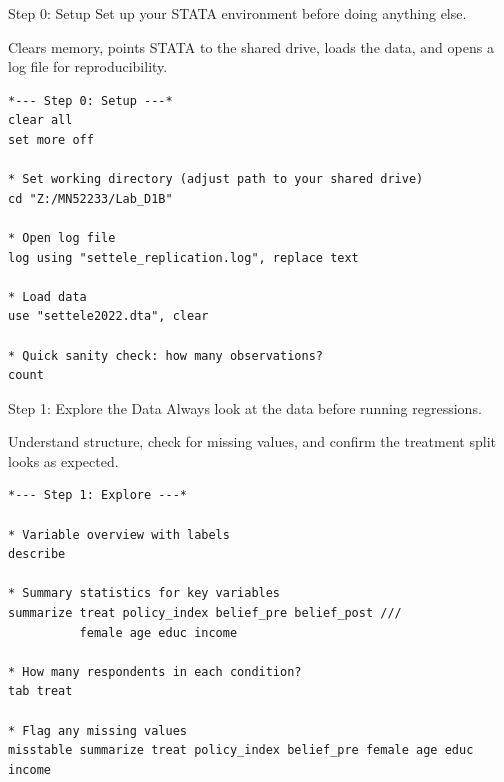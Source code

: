 \documentclass[aspectratio=169, 11pt]{beamer}
\begin{document}

\begin{frame}[fragile, t]{Step 0: Setup}
Set up your STATA environment before doing anything else.
\vspace{0.3em}
\begin{examplebox}
Clears memory, points STATA to the shared drive, loads the data, and opens a log file for reproducibility.
\end{examplebox}
\vspace{0.3em}
\begin{footnotesize}
\begin{verbatim}
*--- Step 0: Setup ---*
clear all
set more off

* Set working directory (adjust path to your shared drive)
cd "Z:/MN52233/Lab_D1B"

* Open log file
log using "settele_replication.log", replace text

* Load data
use "settele2022.dta", clear

* Quick sanity check: how many observations?
count
\end{verbatim}
\end{footnotesize}
\end{frame}


\begin{frame}[fragile, t]{Step 1: Explore the Data}
Always look at the data before running regressions.
\vspace{0.3em}
\begin{examplebox}
Understand structure, check for missing values, and confirm the treatment split looks as expected.
\end{examplebox}
\vspace{0.3em}
\begin{footnotesize}
\begin{verbatim}
*--- Step 1: Explore ---*

* Variable overview with labels
describe

* Summary statistics for key variables
summarize treat policy_index belief_pre belief_post ///
          female age educ income

* How many respondents in each condition?
tab treat

* Flag any missing values
misstable summarize treat policy_index belief_pre female age educ income
\end{verbatim}
\end{footnotesize}
\end{frame}
\end{document}
